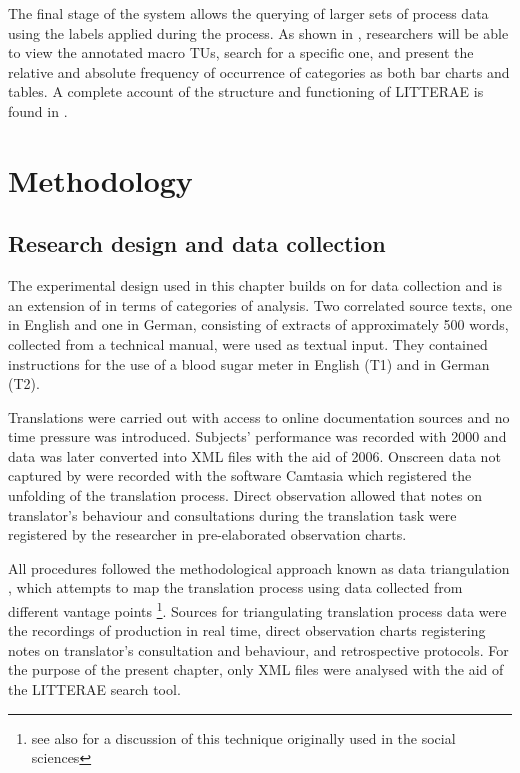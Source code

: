 \documentclass[output=paper]{LSP/langsci}
\begin{document}
The final stage of the system allows the querying of larger sets of process data using the labels applied during the  process. As shown in , researchers will be able to view the annotated macro TUs, search for a specific one, and present the relative and absolute frequency of occurrence of categories as both bar charts and tables. A complete account of the structure and functioning of LITTERAE is found in \citet{AlvesVale2009}.

\section{Methodology}\label{sec:alves:3}
\subsection{Research design and data collection}\label{sec:alves:3.1}

The experimental design used in this chapter builds on \citet{AlvesLiparini2009} for data collection and is an extension of \citet{AlvesVale2009} in terms of categories of analysis.  Two correlated source texts, one in English and one in German, consisting of extracts of approximately 500 words, collected from a technical manual, were used as textual input.  They contained instructions for the use of a blood sugar meter in English (T1) and in German (T2). 

Translations were carried out with access to online documentation sources and no time pressure was introduced. Subjects' performance was recorded with  2000 and data was later converted into XML files with the aid of  2006. Onscreen data not captured by  were recorded with the software Camtasia which registered the unfolding of the translation process. Direct observation allowed that notes on translator's behaviour and consultations during the translation task were registered by the researcher in pre-elaborated observation charts.

All procedures followed the methodological approach known as data triangulation \citep{Alves2003}, which attempts to map the translation process using data collected from different vantage points \footnote{see also \cite{Jakobsen1999} for a discussion of this technique originally used in the social sciences}. Sources for triangulating translation process data were the recordings of  production in real time, direct observation charts registering notes on translator's consultation and behaviour, and retrospective protocols. For the purpose of the present chapter, only  XML files were analysed with the aid of the LITTERAE search tool.
\end{document}
